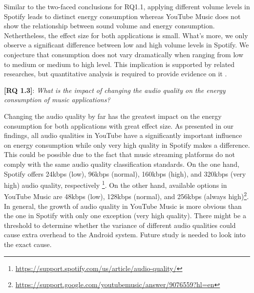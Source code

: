 Similar to the two-faced conclusions for RQ1.1, applying different volume levels in Spotify leads to distinct energy consumption whereas YouTube Music does not show the relationship between sound volume and energy consumption. Nethertheless, the effect size for both applications is small. What’s more, we only observe a significant difference between low and high volume levels in Spotify. We conjecture that consumption does not vary dramatically when ranging from low to medium or medium to high level. This implication is supported by related researches, but quantitative analysis is required to provide evidence on it \cite{33}. 

\textbf{[RQ 1.3]}: \emph{What is the impact of changing the audio quality on the energy consumption of music applications?}

Changing the audio quality by far has the greatest impact on the energy consumption for both applications with great effect size. As presented in our findings, all audio qualities in YouTube have a significantly important influence on energy consumption while only very high quality in Spotify makes a difference. This could be possible due to the fact that music streaming platforms do not comply with the same audio quality classification standards. On the one hand, Spotify offers 24kbps (low), 96kbps (normal), 160kbps (high), and 320kbps (very high) audio quality, respectively \footnote{\label{note1}\href{ https://support.spotify.com/us/article/audio-quality/}{\url{https://support.spotify.com/us/article/audio-quality/}}}. On the other hand, available options in YouTube Music are 48kbps (low), 128kbps (normal), and 256kbps (always high)\footnote{\label{note1}\href{ https://support.google.com/youtubemusic/answer/9076559?hl=en}{\url{https://support.google.com/youtubemusic/answer/9076559?hl=en}}}. In general, the growth of audio quality in YouTube Music is more obvious than the one in Spotify with only one exception (\ie very high quality). There might be a threshold to determine whether the variance of different audio qualities could cause extra overhead to the Android system. Future study is needed to look into the exact cause.  

